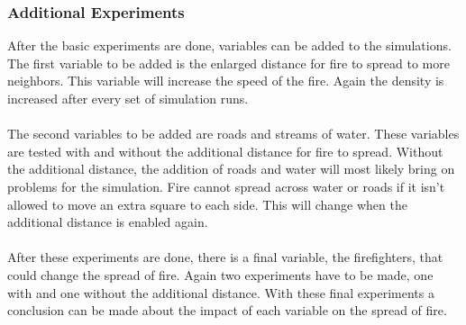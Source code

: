 \documentclass{article}
\begin{document}
\begin{multicols}{2}
\subsubsection*{Additional Experiments}
After the basic experiments are done, variables can be added to the simulations. The first variable to be added is the enlarged distance for fire to spread to more neighbors. This variable will increase the speed of the fire. Again the density is increased after every set of simulation runs.\\\\
The second variables to be added are roads and streams of water. These variables are tested with and without the additional distance for fire to spread. Without the additional distance, the addition of roads and water will most likely bring on problems for the simulation. Fire cannot spread across water or roads if it isn't allowed to move an extra square to each side. This will change when the additional distance is enabled again.\\\\
After these experiments are done, there is a final variable, the firefighters, that could change the spread of fire. Again two experiments have to be made, one with and one without the additional distance. With these final experiments a conclusion can be made about the impact of each variable on the spread of fire.


\end{multicols}
\end{document}

